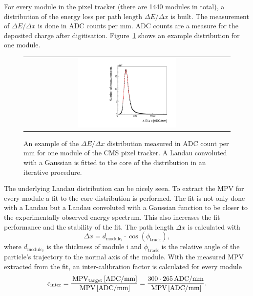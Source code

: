 For every module in the pixel tracker (there are 1440 modules in total), a distribution of the energy loss per path length $\Delta E/\Delta x$ is built.
The measurement of $\Delta E/\Delta x$ is done in ADC counts per mm.
ADC counts are a measure for the deposited charge after digitisation.
Figure~\ref{fig:dEdx_Module} shows an example distribution for one module.
\begin{figure}[!t]
  \centering 
  \begin{tabular}{c}
  \includegraphics[width=0.49\textwidth]{figures/analysis/Landau_Module_352476680.pdf}
  \end{tabular}
  \caption{An example of the $\Delta E/\Delta x$ distribution measured in ADC count per mm for one module of the CMS pixel tracker. 
           A Landau convoluted with a Gaussian is fitted to the core of the distribution in an iterative procedure.} 
  \label{fig:dEdx_Module}
\end{figure}
The underlying Landau distribution can be nicely seen. 
To extract the MPV for every module a fit to the core distribution is performed.
The fit is not only done with a Landau but a Landau convoluted with a Gaussian function to be closer to the experimentally observed energy spectrum.
This also increases the fit performance and the stability of the fit.
The path length $\Delta x$ is calculated with
\begin{equation}
\Delta x = d_{\text{module}_i} \cdot \cos(\phi_{\text{track}}),
\end{equation}
where $d_{\text{module}_i}$ is the thickness of module i and $\phi_{\text{track}}$ is the relative angle of the particle's trajectory to the normal axis of the module.
With the measured MPV extracted from the fit, an inter-calibration factor is calculated for every module
\begin{equation}
c_{\text{inter}}=\frac{\,\text{MPV}_{\text{target}}\, [\text{ADC/mm}]}{\,\text{MPV}\, [\text{ADC/mm}]} = \frac{300 \cdot 265 \, \text{ADC/mm}}{\,\text{MPV}\, [\text{ADC/mm}]}.
\end{equation}
